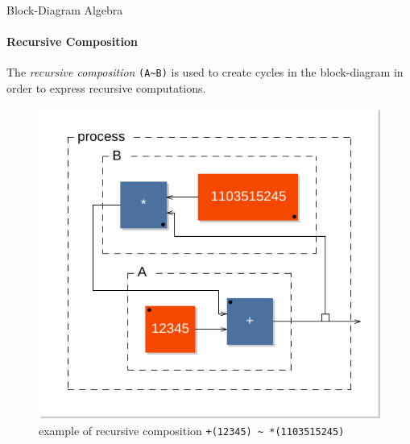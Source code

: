 \begin{frame}[fragile]{Block-Diagram Algebra}
\framesubtitle{Recursive Composition}
    The \emph{recursive composition} \lstinline'(A~B)' is used to create cycles in the block-diagram in order to express recursive computations.
    
    \begin{figure}[h]
    \centering 
    \includegraphics[scale=0.5]{images/rec1} 
    \caption{example of recursive composition \lstinline'+(12345) ~ *(1103515245)'}  
    \label{figure:rec1}
    \end{figure}
\end{frame}
 





